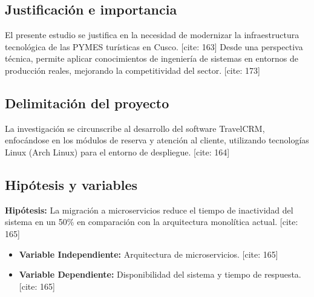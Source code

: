 \subsection{Justificación e importancia}
El presente estudio se justifica en la necesidad de modernizar la infraestructura tecnológica de las PYMES turísticas en Cusco. [cite: 163] Desde una perspectiva técnica, permite aplicar conocimientos de ingeniería de sistemas en entornos de producción reales, mejorando la competitividad del sector. [cite: 173]

\subsection{Delimitación del proyecto}
La investigación se circunscribe al desarrollo del software TravelCRM, enfocándose en los módulos de reserva y atención al cliente, utilizando tecnologías Linux (Arch Linux) para el entorno de despliegue. [cite: 164]

\subsection{Hipótesis y variables}
\textbf{Hipótesis:} La migración a microservicios reduce el tiempo de inactividad del sistema en un 50\% en comparación con la arquitectura monolítica actual. [cite: 165]

\begin{itemize}
    \item \textbf{Variable Independiente:} Arquitectura de microservicios. [cite: 165]
    \item \textbf{Variable Dependiente:} Disponibilidad del sistema y tiempo de respuesta. [cite: 165]
\end{itemize}